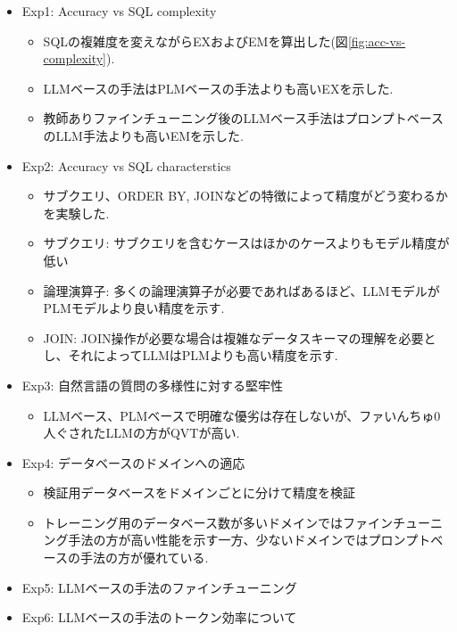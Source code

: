 \documentclass[dvipdfmx,uplatex]{jsarticle}
\theoremstyle{remark}
\newenvironment{experiment}[1]{
    \begin{tcolorbox}[
        colframe=violet,
        colback=violet!10!white,
        colbacktitle=violet!40!white,
        coltitle=black,
        fonttitle=\bfseries,
        title={#1}
    ]
}{
    \end{tcolorbox}
}
\begin{document}
\begin{experiment}{実験結果}
\begin{itemize}
    \item Exp1: Accuracy vs SQL complexity
    \begin{itemize}
        \item SQLの複雑度を変えながらEXおよびEMを算出した(図\ref{fig:acc-vs-complexity}).
        \item LLMベースの手法はPLMベースの手法よりも高いEXを示した.
        \item 教師ありファインチューニング後のLLMベース手法はプロンプトベースのLLM手法よりも高いEMを示した.
    \end{itemize}
    \item Exp2: Accuracy vs SQL characterstics
    \begin{itemize}
        \item サブクエリ、ORDER BY, JOINなどの特徴によって精度がどう変わるかを実験した.
        \item サブクエリ: サブクエリを含むケースはほかのケースよりもモデル精度が低い
        \item 論理演算子: 多くの論理演算子が必要であればあるほど、LLMモデルがPLMモデルより良い精度を示す.
        \item JOIN: JOIN操作が必要な場合は複雑なデータスキーマの理解を必要とし、それによってLLMはPLMよりも高い精度を示す.
    \end{itemize}
    \item Exp3: 自然言語の質問の多様性に対する堅牢性
    \begin{itemize}
        \item LLMベース、PLMベースで明確な優劣は存在しないが、ファいんちゅ0人ぐされたLLMの方がQVTが高い.
    \end{itemize}
    \item Exp4: データベースのドメインへの適応
    \begin{itemize}
        \item 検証用データベースをドメインごとに分けて精度を検証
        \item トレーニング用のデータベース数が多いドメインではファインチューニング手法の方が高い性能を示す一方、少ないドメインではプロンプトベースの手法の方が優れている.
    \end{itemize}
    \item Exp5: LLMベースの手法のファインチューニング
    \item Exp6: LLMベースの手法のトークン効率について
    \begin{itemize}

\end{itemize}
\end{itemize}
\end{experiment}
\end{document}
